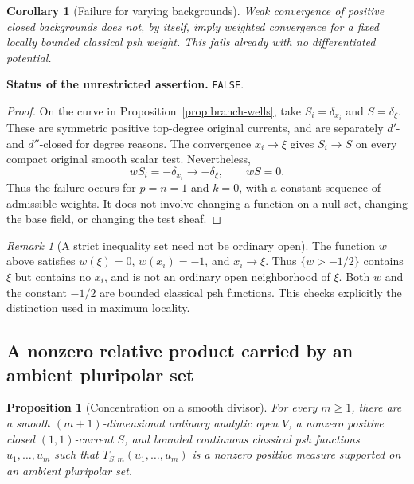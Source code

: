 \documentclass[11pt,a4paper]{article}
\numberwithin{equation}{section}
\newtheorem{proposition}[theorem]{Proposition}
\newtheorem{corollary}[theorem]{Corollary}
\theoremstyle{definition}
\theoremstyle{remark}
\newtheorem{remark}[theorem]{Remark}
\begin{document}
\begin{corollary}[Failure for varying backgrounds]
\label{cor:varying-background-false}
Weak convergence of positive closed backgrounds does not, by itself,
imply weighted convergence for a fixed locally bounded classical psh
weight. This fails already with no differentiated potential.
\end{corollary}

\noindent\textbf{Status of the unrestricted assertion.} \texttt{FALSE}.

\begin{proof}
On the curve in Proposition~\ref{prop:branch-wells}, take
\(S_i=\delta_{x_i}\) and \(S=\delta_\xi\). These are symmetric positive
top-degree original currents, and are separately \(d'\)- and
\(d''\)-closed for degree reasons. The convergence \(x_i\to\xi\)
gives \(S_i\to S\) on every compact original smooth scalar test.
Nevertheless,
\[
 wS_i=-\delta_{x_i}\longrightarrow-\delta_\xi,
 \qquad wS=0.
\]
Thus the failure occurs for \(p=n=1\) and \(k=0\), with a constant
sequence of admissible weights. It does not involve changing a function
on a null set, changing the base field, or changing the test sheaf.
\end{proof}

\begin{remark}[A strict inequality set need not be ordinary open]
The function $w$ above satisfies $w(\xi)=0$, $w(x_i)=-1$, and
$x_i\to\xi$. Thus $\{w>-1/2\}$ contains $\xi$ but contains no
$x_i$, and is not an ordinary open neighborhood of $\xi$. Both $w$
and the constant $-1/2$ are bounded classical psh functions. This
checks explicitly the distinction used in maximum locality.
\end{remark}

\subsection{A nonzero relative product carried by an ambient pluripolar set}

\begin{proposition}[Concentration on a smooth divisor]
\label{prop:polar-relative-mass}
For every \(m\geq1\), there are a smooth \((m+1)\)-dimensional ordinary
analytic open \(V\), a nonzero positive closed \((1,1)\)-current \(S\),
and bounded continuous classical psh functions \(u_1,\ldots,u_m\) such
that \(T_{S,m}(u_1,\ldots,u_m)\) is a nonzero positive measure supported
on an ambient pluripolar set.
\end{proposition}
\end{document}

